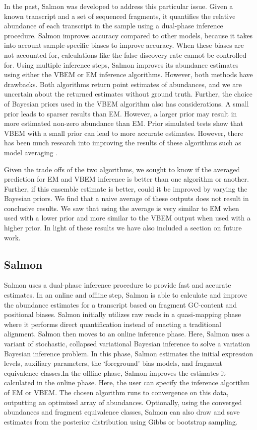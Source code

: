 In the past, Salmon was developed to address this particular issue. Given a known transcript and a set of sequenced fragments, 
it quantifies the relative abundance of each transcript in the sample using a dual-phase inference procedure. 
Salmon improves accuracy compared to other models, because it takes into account sample-specific biases to improve accuracy. 
When these biases are not accounted for, calculations like the false discovery rate cannot be controlled for. 
Using multiple inference steps, Salmon improves its abundance estimates using either the VBEM or EM inference algorithms. 
However, both methods have drawbacks. Both algorithms return point estimates of abundances, and we are uncertain about the returned 
estimates without ground truth. Further, the choice of  Bayesian priors used in the VBEM algorithm also has considerations. 
A small prior leads to sparser results than EM. However, a larger prior may result in more estimated non-zero abundance than EM. 
Prior simulated tests \cite{noauthor_salmon_nodate} show that VBEM with a small prior can lead to more accurate estimates. However, 
there has been much research into improving the results of these algorithms such as model averaging \cite{hoeting_bayesian_1999}. 

Given the trade offs of the two algorithms, we sought to know if the averaged prediction for EM and VBEM inference is better than 
one algorithm or another. Further, if this ensemble estimate is better, could it be improved by varying the Bayesian priors.
We find that a naive average of these outputs does not result in conclusive results. We saw that using the average is very similar to EM when used with a lower prior and more similar to the VBEM output when used with 
a higher prior. In light of these results we have also included a section on future work. 

\subsection{Salmon}
Salmon uses a dual-phase inference procedure to provide fast and accurate estimates. 
In an online and offline step, Salmon is able to calculate and improve the abundance 
estimates for a transcript based on fragment GC-content and positional biases. 
Salmon initially utilizes raw reads in a quasi-mapping phase where it performs direct 
quantification instead of enacting a traditional alignment. 
Salmon then moves to an online inference phase. 
Here, Salmon uses a variant of stochastic, collapsed variational Bayesian inference to solve 
a variation Bayesian inference problem. 
In this phase, Salmon estimates the initial expression levels, auxiliary parameters, 
the ‘foreground’ bias models, and fragment equivalence classes.In the offline phase, 
Salmon improves the estimates it calculated in the online phase. Here, the user can 
specify the inference algorithm of EM or VBEM. The chosen algorithm runs to convergence 
on this data, outputting an optimized array of abundances. 
Optionally, using the converged abundances and fragment equivalence classes, 
Salmon can also draw and save estimates from the posterior distribution using Gibbs or bootstrap sampling. 
